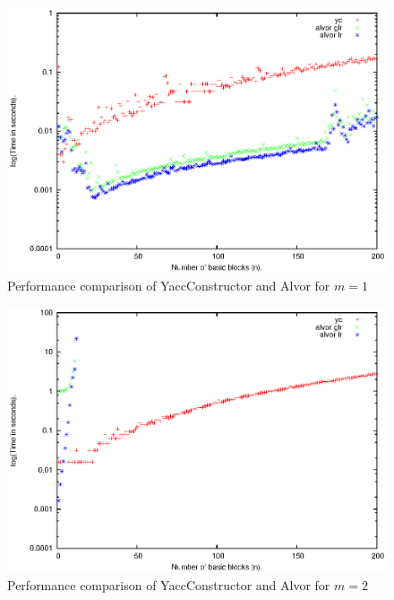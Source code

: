 \documentclass{sigplanconf}
\begin{document}
      \begin{figure}[h!]%
        \includegraphics[scale=0.65]{Graphics/m1.eps}
        \caption{Performance comparison of YaccConstructor and Alvor for $m = 1$}
        \label{perfm1}
      \end{figure}
      \begin{figure}[h!]%
        \includegraphics[scale=0.65]{Graphics/m2.eps}
        \caption{Performance comparison of YaccConstructor and Alvor for $m = 2$}
        \label{perfm2}
      \end{figure}
\end{document}
